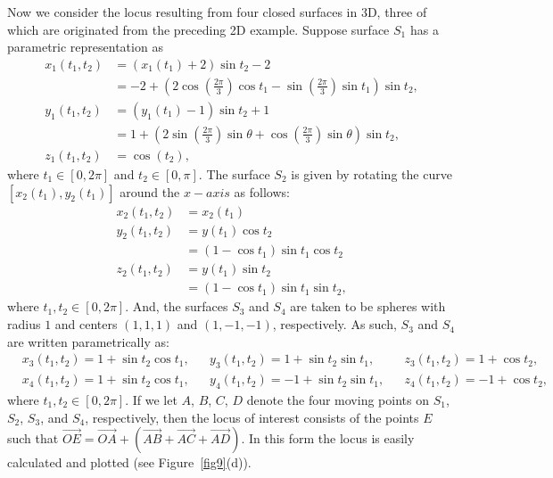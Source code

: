 \documentclass[12pt,a4paper]{article}%
\begin{document}
Now we consider the locus resulting from four closed surfaces in 3D, three of which
are originated from the preceding 2D example. Suppose surface $S_{1}$ has a
parametric representation as
\begin{align*}
x_{1}(t_{1},t_{2})
  & =\left(  x_{1}\left(  t_{1}\right)  +2\right)  \sin t_{2}-2\\
  & =-2+\left(  2\cos\left(  \frac{2\pi}{3}\right)  \cos t_{1}
        -\sin\left(\frac{2\pi}{3}\right)  \sin t_{1}\right)  \sin t_{2},\\
y_{1}\left(  t_{1},t_{2}\right)
  & =\left(  y_{1}\left(  t_{1}\right)-1\right)  \sin t_{2}+1\\
  & =1+\left(  2\sin\left(  \frac{2\pi}{3}\right)  \sin\theta+\cos\left(\frac{2\pi}{3}\right)  \sin\theta\right)  \sin t_{2},\\
z_{1}(t_{1},t_{2})
  & =\cos\left(  t_{2}\right)  ,
\end{align*}
where $t_{1}\in\left[  0,2\pi\right]  $ and $t_{2}\in\left[  0,\pi\right]$.
The surface $S_{2}$ is given by rotating the curve
$\left[  x_{2}\left(t_{1}\right)  ,y_{2}(t_{1})\right]  $ around the $x-axis$ as follows:
\begin{align*}
x_{2}\left(  t_{1},t_{2}\right)
  & =x_{2}\left(  t_{1}\right) \\
y_{2}\left(  t_{1},t_{2}\right)
  & =y\left(  t_{1}\right)  \cos t_{2}\\
  & =\left(  1-\cos t_{1}\right)  \sin t_{1}\cos t_{2}\\
z_{2}(t_{1},t_{2})
  & =y\left(  t_{1}\right)  \sin t_{2}\\
  & =\left(  1-\cos t_{1}\right)  \sin t_{1}\sin t_{2},
\end{align*}
where $t_{1},t_{2}\in\left[  0,2\pi\right]$. And, the surfaces $S_{3}$ and $S_4$
are taken to be spheres with radius $1$ and centers $(1,1,1)$ and $(1,-1,-1)$,
respectively. As such, $S_{3}$ and $S_{4}$ are written parametrically as:
\begin{align*}
&x_{3}(t_{1},t_{2})
  =1+\sin t_{2}\cos t_{1},
&&y_{3}(t_{1},t_{2})
  =1+\sin t_{2}\sin t_{1},
&&z_{3}(t_{1},t_{2})
  =1+\cos t_{2},\\
&x_{4}(t_{1},t_{2})
 =1+\sin t_{2}\cos t_{1},
&&y_{4}(t_{1},t_{2})
  =-1+\sin t_{2}\sin t_{1},
&&z_{4}(t_{1},t_{2})
 =-1+\cos t_{2},
\end{align*}
where $t_{1},t_{2}\in\left[  0,2\pi\right]$.
If we let $A$, $B$, $C$, $D$ denote the four
moving points on $S_{1}$, $S_{2}$, $S_{3}$, and $S_{4}$, respectively,
then the locus of interest consists of the points $E$ such that
$\overrightarrow{OE}=\overrightarrow{OA}+( \overrightarrow{AB}
                                 +\overrightarrow{AC}+\overrightarrow{AD})$.
In this form the locus is easily calculated and plotted (see Figure~\ref{fig9}(d)).
\end{document}
